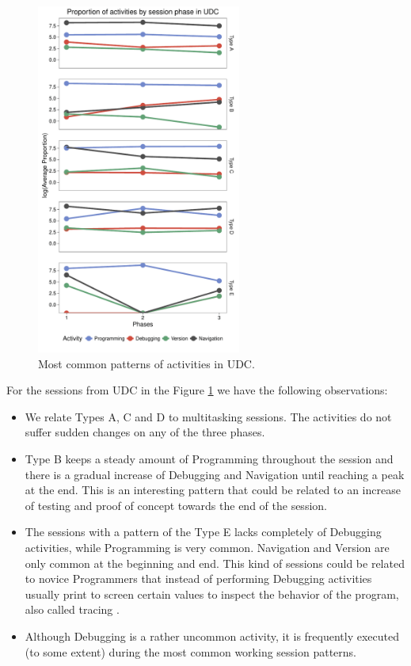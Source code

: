 \begin{figure}[!ht]
	
	\centering
	\includegraphics[width=0.6\textwidth]{Figures/UDC_phases_log}
	
	\caption{Most common patterns of activities in UDC.}
	\label{UDC_phases}
\end{figure}

For the sessions from UDC in the Figure \ref{UDC_phases} we have the following observations:
\begin{itemize}
	\item We relate Types A, C and D to multitasking sessions. The activities do not suffer sudden changes on any of the three phases.
	
	\item Type B keeps a steady amount of Programming throughout the session and there is a gradual increase of Debugging and Navigation until reaching a peak at the end. This is an interesting pattern that could be related to an increase of testing and proof of concept towards the end of the session.
	
	\item The sessions with a pattern of the Type E lacks completely of Debugging activities, while Programming is very common. Navigation and Version are only common at the beginning and end. This kind of sessions could be related to novice Programmers that instead of performing Debugging activities usually print to screen certain values to inspect the behavior of the program, also called tracing \cite{MKM08, AEH05}.
	
	\item Although Debugging is a rather uncommon activity, it is frequently executed (to some extent) during the most common working session patterns.
\end{itemize}

